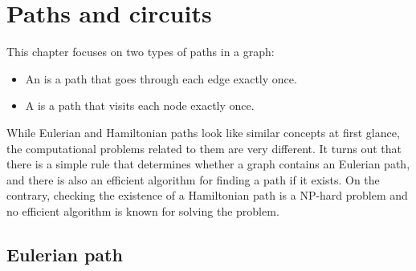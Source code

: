 \chapter{Paths and circuits}

This chapter focuses on two types of paths in a graph:
\begin{itemize}
\item An  is a path that
goes through each edge exactly once.
\item A  is a path
that visits each node exactly once.
\end{itemize}
While Eulerian and Hamiltonian paths look like
similar concepts at first glance,
the computational problems related to them
are very different.
It turns out that there is a simple rule that
determines whether a graph contains an Eulerian path,
and there is also an efficient algorithm for
finding a path if it exists.
On the contrary, checking the existence of a Hamiltonian path is a NP-hard
problem and no efficient algorithm is known for solving the problem.

\section{Eulerian path}


